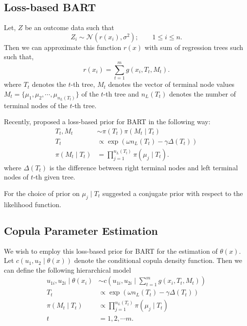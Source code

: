 \documentclass{amsart}
\begin{document}
\subsection{Loss-based BART}

Let, $Z$ be an outcome data such that 
\begin{equation}
	Z_i \sim \mathcal{N}\left(r(x_i),\sigma^2\right);\qquad 1\le i\le n.
\end{equation}
Then we can approximate this function $r(x)$ with sum of regression trees such such that,
\begin{equation}
	r(x_i) = \sum_{t=1}^m g(x_i, T_t, M_t).
\end{equation}
where $T_t$ denotes the $t$-th tree, $M_t$ denotes the vector of terminal node values $M_t = \{\mu_1,\mu_2, \cdots, \mu_{n_L(T_t)}\}$ of the $t$-th tree and $n_L(T_t)$ denotes the number of terminal nodes of the $t$-th tree. 

Recently, \citet{serafini2024lossbasedpriortreetopologies} proposed a loss-based prior for BART in the following way:
\begin{align}
	T_t, M_t &\sim \pi(T_t)\pi(M_t\mid T_t)\\
	T_t &\propto \exp\left(\omega n_L(T_t)-\gamma\Delta(T_t)\right)\\
	\pi(M_t\mid T_t) & = \prod_{j=1}^{n_L(T_t)}\pi(\mu_j\mid T_t).
\end{align}
where $\Delta(T_t)$ is the difference between right terminal nodes and left terminal nodes of $t$-th given tree.

For the choice of prior on $\mu_j\mid T_t$ \citet{chipman_BART,serafini2024lossbasedpriortreetopologies} suggested a conjugate prior with respect to the likelihood function. 

\subsection{Copula Parameter Estimation}

We wish to employ this loss-based prior for BART for the estimation of $\theta(x)$. Let $c(u_1,u_2\mid \theta(x))$ denote the conditional copula density function. Then we can define the following hierarchical model
\begin{align}
	u_{1i},u_{2i} \mid \theta(x_i) & \sim c(u_{1i},u_{2i}\mid \sum_{t=1}^m g(x_i, T_t, M_t))\\
	T_t &\propto \exp\left(\omega n_L(T_t)-\gamma\Delta(T_t)\right)\\
	\pi(M_t\mid T_t) &\propto \prod_{j=1}^{n_L(T_t)}\pi(\mu_j\mid T_t)\\
	t & = 1,2,\cdots m.
\end{align}
\end{document}
